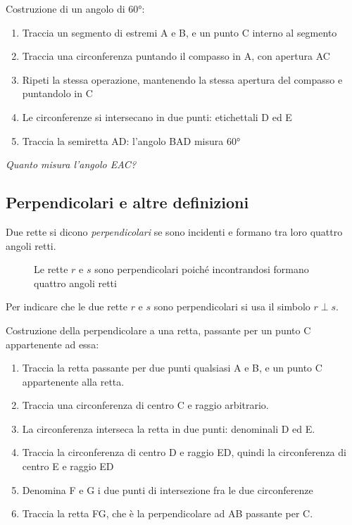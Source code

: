 \begin{procedura}
	Costruzione di un angolo di 60°:
	\begin{enumerate} [nosep]
		\item 
		Traccia un segmento di estremi A e B, e un punto C interno al segmento  
		\item 
		Traccia una circonferenza puntando il compasso in A, con apertura AC  
		\item 
		Ripeti la stessa operazione, mantenendo la stessa apertura del compasso e 
		puntandolo in C
		\item
		Le circonferenze si intersecano in due punti: etichettali D ed E  
		\item
		Traccia la semiretta AD: l'angolo BAD misura 60°
	\end{enumerate}
\end{procedura}
\textsl{Quanto misura l'angolo EAC?}

\subsection{Perpendicolari e altre definizioni}

\begin{definizione}
Due rette si dicono \emph{perpendicolari} se sono incidenti e formano 
tra loro quattro angoli retti.
\end{definizione}


\begin{inaccessibleblock}
 \begin{figure}[htb]
\centering
\caption{Le rette $r$ e $s$ sono perpendicolari poiché incontrandosi 
formano quattro angoli retti}
\end{figure}
\end{inaccessibleblock}

Per indicare che le due rette $r$ e $s$ sono perpendicolari si usa il 
simbolo $r\perp s$.

\begin{procedura}
	Costruzione della perpendicolare a una retta, passante per un punto C appartenente ad essa:
	\begin{enumerate} [nosep]
		\item 
		Traccia la retta passante per due punti qualsiasi A e B, e un punto C appartenente alla retta.
		\item 
		Traccia una circonferenza di centro C e raggio arbitrario. 
		\item 
		La circonferenza interseca la retta in due punti: denominali D ed E.
		\item 
		Traccia la circonferenza di centro D e raggio ED, quindi la circonferenza di centro E e raggio ED
		\item 
		Denomina F e G i due punti di intersezione fra le due circonferenze
		\item 
		Traccia la retta FG, che è la perpendicolare ad AB passante per C.
	\end{enumerate}
\end{procedura}

